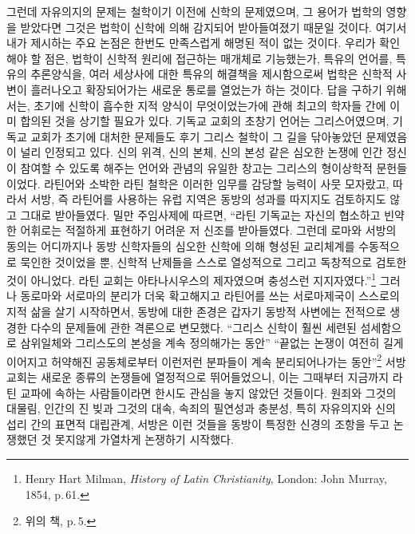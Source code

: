 그런데 자유의지의 문제는
철학이기 이전에 신학의 문제였으며,
그 용어가 법학의 영향을 받았다면
그것은
법학이 신학에 의해 감지되어 받아들여졌기 때문일 것이다.
여기서 내가 제시하는 주요 논점은 한번도 만족스럽게 해명된 적이 없는 것이다.
우리가 확인해야 할 점은,
법학이
신학적 원리에 접근하는 매개체로
기능했는가,
특유의 언어를, 특유의 추론양식을, 여러 세상사에 대한 특유의 해결책을
제시함으로써 법학은 신학적 사변이 흘러나오고 확장되어가는
새로운 통로를 열었는가 하는 것이다.
답을 구하기 위해서는,
초기에 신학이 흡수한 지적 양식이 무엇이었는가에 관해
최고의 학자들 간에 이미 합의된 것을 상기할 필요가 있다.
기독교 교회의 초창기 언어는 그리스어였으며,
기독교 교회가 초기에 대처한 문제들도
후기 그리스 철학이 그 길을 닦아놓았던 문제였음이
널리 인정되고 있다.
신의 위격,
신의 본체,
신의 본성 같은 심오한 논쟁에 인간 정신이 참여할 수 있도록
해주는 언어와 관념의 유일한 창고는
그리스의 형이상학적 문헌들이었다.
라틴어와 소박한 라틴 철학은 이러한 임무를 감당할 능력이 사뭇 모자랐고,
따라서 서방, 즉 라틴어를 사용하는 유럽 지역은
동방의 성과를 따지지도 검토하지도 않고 그대로 받아들였다.
밀만 주임사제에 따르면,
``라틴 기독교는 자신의 협소하고 빈약한 어휘로는 적절하게 표현하기 어려운
저 신조를 받아들였다.
그런데 로마와 서방의 동의는 어디까지나
동방 신학자들의
심오한 신학에 의해 형성된 교리체계를 수동적으로 묵인한 것이었을 뿐,
신학적 난제들을 스스로 열성적으로 그리고 독창적으로 검토한 것이 아니었다.
라틴 교회는 아타나시우스의 제자였으며
충성스런 지지자였다.''\footnote{%
  \latinmarks
  Henry Hart Milman, \textit{History of Latin Christianity},
  London: John Murray, 1854, p.\,61. }
그러나 동로마와 서로마의 분리가 더욱 확고해지고
라틴어를 쓰는 서로마제국이 스스로의 지적 삶을 살기 시작하면서,
동방에 대한 존경은 갑자기
동방적 사변에는 전적으로 생경한
다수의 문제들에 관한 격론으로 변모했다.
``그리스 신학이
훨씬 세련된 섬세함으로 삼위일체와 그리스도의 본성을 계속 정의해가는 동안''
``끝없는 논쟁이 여전히 길게 이어지고
허약해진 공동체로부터 이런저런 분파들이 계속 분리되어나가는 동안''\footnote{%
  위의 책, p.\,5. }
서방 교회는
새로운 종류의 논쟁들에 열정적으로 뛰어들었으니,
이는 그때부터 지금까지 라틴 교파에 속하는 사람들이라면 한시도
관심을 놓지 않았던 것들이다.
원죄와 그것의 대물림,
인간의 진 빚과 그것의 대속,
속죄의 필연성과 충분성,
특히 자유의지와 신의 섭리 간의 표면적 대립관계,
서방은
이런 것들을
동방이 특정한 신경의 조항을 두고 논쟁했던 것 못지않게
가열차게 논쟁하기 시작했다.
